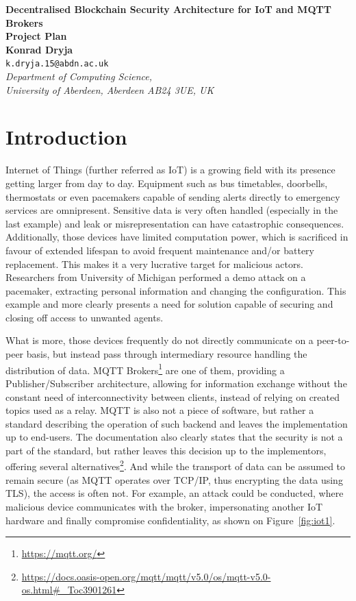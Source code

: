 \documentclass[a4paper,12pt]{article}
\begin{document}
\begin{center}
{\Large\bf{Decentralised Blockchain Security Architecture for IoT and MQTT Brokers}} \\
      \vspace{5.0mm}
{\Large\bf{Project Plan}} \\
      \vspace{8mm}
      {\large\bf{Konrad Dryja}}  \\
      \vspace{5.0mm}
       {\tt k.dryja.15@abdn.ac.uk} \\
      \vspace{5.0mm}
      {\em Department of Computing Science,\\
       University of Aberdeen, Aberdeen AB24 3UE, UK} 
\end{center}


\section*{Introduction}

Internet of Things (further referred as IoT) is a growing field with its presence getting larger from day to day. Equipment such as bus timetables, doorbells, thermostats or even pacemakers capable of sending alerts directly to emergency services are omnipresent. Sensitive data is very often handled (especially in the last example) and leak or misrepresentation can have catastrophic consequences. Additionally, those devices have limited computation power, which is sacrificed in favour of extended lifespan to avoid frequent maintenance and/or battery replacement. This makes it a very lucrative target for malicious actors. Researchers from University of Michigan performed a demo attack on a pacemaker, extracting personal information and changing the configuration.\cite{4531149} This example and more clearly presents a need for solution capable of securing and closing off access to unwanted agents.

What is more, those devices frequently do not directly communicate on a peer-to-peer basis, but instead pass through intermediary resource handling the distribution of data. MQTT Brokers\footnote{\url{https://mqtt.org/}} are one of them, providing a Publisher/Subscriber architecture, allowing for information exchange without the constant need of interconnectivity between clients, instead of relying on created topics used as a relay. MQTT is also not a piece of software, but rather a standard describing the operation of such backend and leaves the implementation up to end-users. The documentation also clearly states that the security is not a part of the standard, but rather leaves this decision up to the implementors, offering several alternatives\footnote{\url{https://docs.oasis-open.org/mqtt/mqtt/v5.0/os/mqtt-v5.0-os.html\#\_Toc3901261}}. And while the transport of data can be assumed to remain secure (as MQTT operates over TCP/IP, thus encrypting the data using TLS), the access is often not. For example, an attack could be conducted, where malicious device communicates with the broker, impersonating another IoT hardware and finally compromise confidentiality, as shown on Figure~\ref{fig:iot1}.
\end{document}
